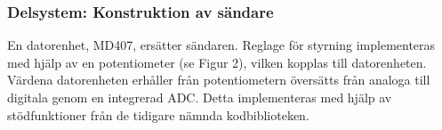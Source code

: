 \documentclass[a4paper]{article}
\begin{document}




\subsubsection{Delsystem: Konstruktion av sändare}
En datorenhet, MD407, ersätter sändaren. Reglage för styrning implementeras med hjälp av en potentiometer (se Figur 2), vilken kopplas till datorenheten. Värdena datorenheten erhåller från potentiometern översätts från analoga till digitala genom en integrerad ADC. Detta implementeras med hjälp av stödfunktioner från de tidigare nämnda kodbiblioteken.
\end{document}

